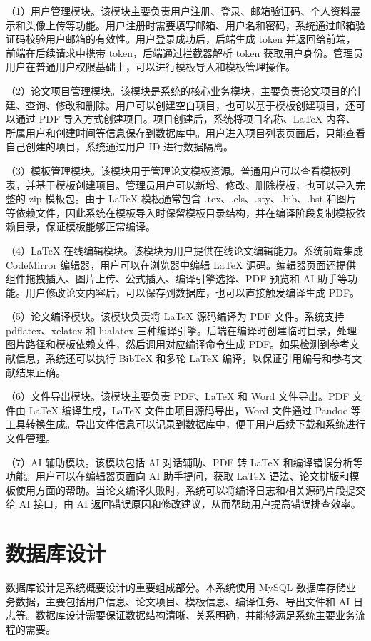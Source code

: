 \documentclass{xduugthesis}
\begin{document}
（1）用户管理模块。该模块主要负责用户注册、登录、邮箱验证码、个人资料展示和头像上传等功能。用户注册时需要填写邮箱、用户名和密码，系统通过邮箱验证码校验用户邮箱的有效性。用户登录成功后，后端生成 token 并返回给前端，前端在后续请求中携带 token，后端通过拦截器解析 token 获取用户身份。管理员用户在普通用户权限基础上，可以进行模板导入和模板管理操作。

（2）论文项目管理模块。该模块是系统的核心业务模块，主要负责论文项目的创建、查询、修改和删除。用户可以创建空白项目，也可以基于模板创建项目，还可以通过 PDF 导入方式创建项目。项目创建后，系统将项目名称、LaTeX 内容、所属用户和创建时间等信息保存到数据库中。用户进入项目列表页面后，只能查看自己创建的项目，系统通过用户 ID 进行数据隔离。

（3）模板管理模块。该模块用于管理论文模板资源。普通用户可以查看模板列表，并基于模板创建项目。管理员用户可以新增、修改、删除模板，也可以导入完整的 zip 模板包。由于 LaTeX 模板通常包含 .tex、.cls、.sty、.bib、.bst 和图片等依赖文件，因此系统在模板导入时保留模板目录结构，并在编译阶段复制模板依赖目录，保证模板能够正常编译。

（4）LaTeX 在线编辑模块。该模块为用户提供在线论文编辑能力。系统前端集成 CodeMirror 编辑器，用户可以在浏览器中编辑 LaTeX 源码。编辑器页面还提供组件拖拽插入、图片上传、公式插入、编译引擎选择、PDF 预览和 AI 助手等功能。用户修改论文内容后，可以保存到数据库，也可以直接触发编译生成 PDF。

（5）论文编译模块。该模块负责将 LaTeX 源码编译为 PDF 文件。系统支持 pdflatex、xelatex 和 lualatex 三种编译引擎。后端在编译时创建临时目录，处理图片路径和模板依赖文件，然后调用对应编译命令生成 PDF。如果检测到参考文献信息，系统还可以执行 BibTeX 和多轮 LaTeX 编译，以保证引用编号和参考文献结果正确。

（6）文件导出模块。该模块主要负责 PDF、LaTeX 和 Word 文件导出。PDF 文件由 LaTeX 编译生成，LaTeX 文件由项目源码导出，Word 文件通过 Pandoc 等工具转换生成。导出文件信息可以记录到数据库中，便于用户后续下载和系统进行文件管理。

（7）AI 辅助模块。该模块包括 AI 对话辅助、PDF 转 LaTeX 和编译错误分析等功能。用户可以在编辑器页面向 AI 助手提问，获取 LaTeX 语法、论文排版和模板使用方面的帮助。当论文编译失败时，系统可以将编译日志和相关源码片段提交给 AI 接口，由 AI 返回错误原因和修改建议，从而帮助用户提高错误排查效率。

\section{数据库设计}
数据库设计是系统概要设计的重要组成部分。本系统使用 MySQL 数据库存储业务数据，主要包括用户信息、论文项目、模板信息、编译任务、导出文件和 AI 日志等。数据库设计需要保证数据结构清晰、关系明确，并能够满足系统主要业务流程的需要。
\end{document}
